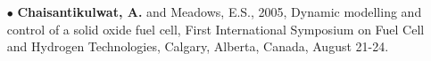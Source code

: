 \documentclass[10pt, letterpaper]{article}
\begin{document}
{{{\begin{itemize}
	\item[\tiny$\bullet$] \textbf{Chaisantikulwat, A.} and Meadows, E.S., 2005, Dynamic modelling and control of a solid oxide fuel cell, First International Symposium on Fuel Cell and Hydrogen Technologies, Calgary, Alberta, Canada, August 21-24.
\end{itemize}

%	
%		
	
}}}
\end{document}

